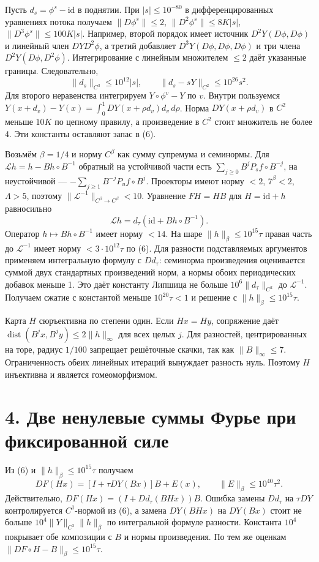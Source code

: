 \documentclass[11pt,a4paper]{article}
\newcommand{\sect}[1]{\section*{\sffamily\color{ink}#1}}
\begin{document}
Пусть $d_s=\phi^s-\mathrm{id}$ в поднятии. При $|s|\le10^{-80}$ в дифференцированных уравнениях потока получаем $\|D\phi^s\|\le2$, $\|D^2\phi^s\|\le8K|s|$, $\|D^3\phi^s\|\le100K|s|$. Например, второй порядок имеет источник $D^2Y(D\phi,D\phi)$ и линейный член $DY D^2\phi$, а третий добавляет $D^3Y(D\phi,D\phi,D\phi)$ и три члена $D^2Y(D\phi,D^2\phi)$. Интегрирование с линейным множителем $\le2$ даёт указанные границы. Следовательно,
\[
            \|d_s\|_{C^3}\le10^{12}|s|,
      \qquad \|d_s-sY\|_{C^2}\le10^{26}s^2 .                         \tag{6}
\]
Для второго неравенства интегрируем $Y\circ\phi^v-Y$ по $v$. Внутри пользуемся $Y(x+d_v)-Y(x)=\int_0^1 DY(x+\rho d_v)d_v\,d\rho$. Норма $DY(x+\rho d_v)$ в $C^2$ меньше $10K$ по цепному правилу, а произведение в $C^2$ стоит множитель не более 4. Эти константы оставляют запас в (6).

Возьмём $\beta=1/4$ и норму $C^\beta$ как сумму супремума и семинормы. Для $\mathcal L h=h-B h\circ B^{-1}$ обратный на устойчивой части есть $\sum_{j\ge0}B^j P_s f\circ B^{-j}$, на неустойчивой --- $-\sum_{j\ge1} B^{-j}P_u f\circ B^j$. Проекторы имеют норму $<2$, $7^\beta<2$, $\Lambda>5$, поэтому $\|\mathcal L^{-1}\|_{C^\beta\to C^\beta}<10$. Уравнение $F H=HB$ для $H=\mathrm{id}+h$ равносильно
\[
                    \mathcal L h=d_\tau(\mathrm{id}+B h\circ B^{-1}).
\]
Оператор $h\mapsto Bh\circ B^{-1}$ имеет норму $<14$. На шаре $\|h\|_\beta\le10^{15}\tau$ правая часть до $\mathcal L^{-1}$ имеет норму $<3\cdot10^{12}\tau$ по (6). Для разности подставляемых аргументов применяем интегральную формулу с $Dd_\tau$: семинорма произведения оценивается суммой двух стандартных произведений норм, а нормы обоих периодических добавок меньше 1. Это даёт константу Липшица не больше $10^6\|d_\tau\|_{C^2}$ до $\mathcal L^{-1}$. Получаем сжатие с константой меньше $10^{20}\tau<1$ и решение с $\|h\|_\beta\le10^{15}\tau$.

Карта $H$ сюръективна по степени один. Если $H x=H y$, сопряжение даёт $\operatorname{dist}(B^j x,B^j y)\le2\|h\|_\infty$ для всех целых $j$. Для разностей, центрированных на торе, радиус $1/100$ запрещает решёточные скачки, так как $\|B\|_\infty\le7$. Ограниченность обеих линейных итераций вынуждает разность нуль. Поэтому $H$ инъективна и является гомеоморфизмом.
\newpage
\sect{4. Две ненулевые суммы Фурье при фиксированной силе}
Из (6) и $\|h\|_\beta\le10^{15}\tau$ получаем
\[
       D F(Hx)=[I+\tau DY(Bx)]B+E(x),\qquad
       \|E\|_\beta\le10^{40}\tau^2.                                \tag{7}
\]
Действительно, $DF(Hx)=(I+Dd_\tau(BHx))B$. Ошибка замены $Dd_\tau$ на $\tau DY$ контролируется $C^1$-нормой из (6), а замена $DY(BHx)$ на $DY(Bx)$ стоит не больше $10^4\|Y\|_{C^3}\|h\|_\beta$ по интегральной формуле разности. Константа $10^4$ покрывает обе композиции с $B$ и нормы произведения. По тем же оценкам $\|DF\circ H-B\|_\beta\le10^{15}\tau$.
\end{document}
